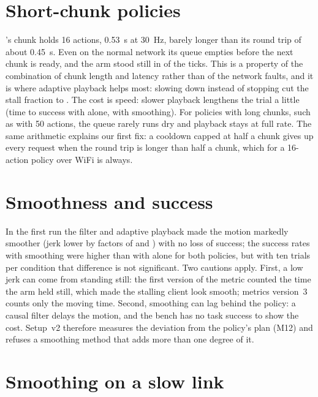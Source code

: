 \section{Short-chunk policies}\label{sec:shortchunk}

\groot's chunk holds 16 actions, 0.53~s at 30~Hz, barely longer than its round trip of about 0.45~s. Even on the
normal network its queue empties before the next chunk is ready, and the arm stood still in
 of the ticks. This is a property of the combination of chunk length and latency rather than
of the network faults, and it is where adaptive playback helps most: slowing down instead of stopping cut the stall
fraction to . The cost is speed: slower playback lengthens the trial a little (time to success
 with \drtc{} alone,  with smoothing). For policies with long chunks,
such as \smolvla{} with 50 actions, the queue rarely runs dry and playback stays at full rate. The same arithmetic
explains our first fix: a cooldown capped at half a chunk gives up every request when the round trip is longer than
half a chunk, which for a 16-action policy over WiFi is always.

\section{Smoothness and success}

In the first run the filter and adaptive playback made the motion markedly smoother (jerk lower by factors of
 and ) with no loss of success; the success rates with smoothing were
higher than with \drtc{} alone for both policies, but with ten trials per condition that difference is not
significant. Two cautions apply. First, a low jerk can come from standing still: the first version of the metric
counted the time the arm held still, which made the stalling client look smooth; metrics version~3 counts only the
moving time. Second, smoothing can lag behind the policy: a causal filter delays the motion, and the bench has no task
success to show the cost. Setup~v2 therefore measures the deviation from the policy's plan (M12) and refuses a smoothing
method that adds more than one degree of it.

\section{Smoothing on a slow link}\label{sec:smoothdisc}

